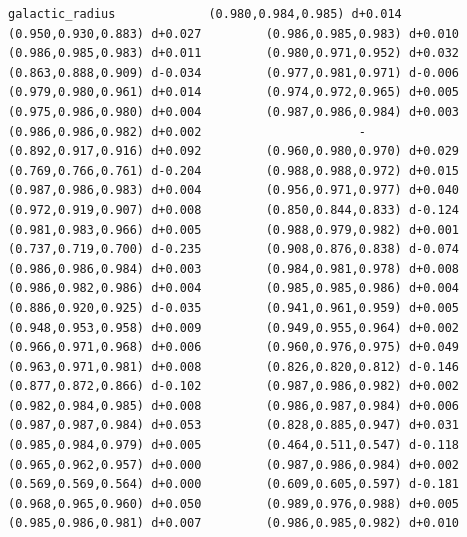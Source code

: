 \documentclass[11pt, letterpaper, openany]{book}
\begin{document}
\begin{empiricalbox}
\begin{lstlisting}[style=terminal]
galactic_radius             (0.980,0.984,0.985) d+0.014         (0.950,0.930,0.883) d+0.027         (0.986,0.985,0.983) d+0.010         (0.986,0.985,0.983) d+0.011         (0.980,0.971,0.952) d+0.032         (0.863,0.888,0.909) d-0.034         (0.977,0.981,0.971) d-0.006         (0.979,0.980,0.961) d+0.014         (0.974,0.972,0.965) d+0.005         (0.975,0.986,0.980) d+0.004         (0.987,0.986,0.984) d+0.003         (0.986,0.986,0.982) d+0.002                      -                      (0.892,0.917,0.916) d+0.092         (0.960,0.980,0.970) d+0.029         (0.769,0.766,0.761) d-0.204         (0.988,0.988,0.972) d+0.015         (0.987,0.986,0.983) d+0.004         (0.956,0.971,0.977) d+0.040         (0.972,0.919,0.907) d+0.008         (0.850,0.844,0.833) d-0.124         (0.981,0.983,0.966) d+0.005         (0.988,0.979,0.982) d+0.001         (0.737,0.719,0.700) d-0.235         (0.908,0.876,0.838) d-0.074         (0.986,0.986,0.984) d+0.003         (0.984,0.981,0.978) d+0.008         (0.986,0.982,0.986) d+0.004         (0.985,0.985,0.986) d+0.004         (0.886,0.920,0.925) d-0.035         (0.941,0.961,0.959) d+0.005         (0.948,0.953,0.958) d+0.009         (0.949,0.955,0.964) d+0.002         (0.966,0.971,0.968) d+0.006         (0.960,0.976,0.975) d+0.049         (0.963,0.971,0.981) d+0.008         (0.826,0.820,0.812) d-0.146         (0.877,0.872,0.866) d-0.102         (0.987,0.986,0.982) d+0.002         (0.982,0.984,0.985) d+0.008         (0.986,0.987,0.984) d+0.006         (0.987,0.987,0.984) d+0.053         (0.828,0.885,0.947) d+0.031         (0.985,0.984,0.979) d+0.005         (0.464,0.511,0.547) d-0.118         (0.965,0.962,0.957) d+0.000         (0.987,0.986,0.984) d+0.002         (0.569,0.569,0.564) d+0.000         (0.609,0.605,0.597) d-0.181         (0.968,0.965,0.960) d+0.050         (0.989,0.976,0.988) d+0.005         (0.985,0.986,0.981) d+0.007         (0.986,0.985,0.982) d+0.010     

\end{lstlisting}
\end{empiricalbox}
\end{document}
